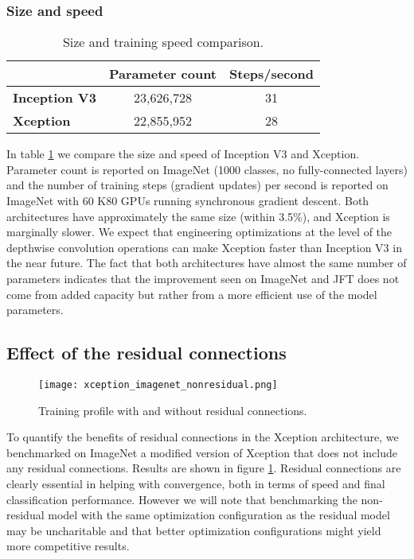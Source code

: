 \documentclass[10pt,twocolumn,letterpaper]{article}
\begin{document}
\subsubsection{Size and speed}

\begin{table}[!ht]
\centering
\caption{Size and training speed comparison.}
\label{sizeandspeed}

  \begin{tabular}{lcc}
  \toprule
               & \textbf{Parameter count} & \textbf{Steps/second} \\ \hline
  \textbf{Inception V3}  &   23,626,728   &     31                 \\ \hline
  \textbf{Xception} &       22,855,952   &     28                   \\ \hline

  \end{tabular}

\end{table}

In table \ref{sizeandspeed} we compare the size and speed of Inception V3 and Xception. Parameter count is reported on ImageNet (1000 classes, no fully-connected layers) and the number of training steps (gradient updates) per second is reported on ImageNet with 60 K80 GPUs running synchronous gradient descent. Both architectures have approximately the same size (within 3.5\%), and Xception is marginally slower. We expect that engineering optimizations at the level of the depthwise convolution operations can make Xception faster than Inception V3 in the near future. The fact that both architectures have almost the same number of parameters indicates that the improvement seen on ImageNet and JFT does not come from added capacity but rather from a more efficient use of the model parameters.


\subsection{Effect of the residual connections}

\begin{figure}[!ht]
  \caption{Training profile with and without residual connections.}
  \label{xception_imagenet_nonresidual}
  \centering
    \texttt{[image: xception\_imagenet\_nonresidual.png]}
\end{figure}

To quantify the benefits of residual connections in the Xception architecture, we benchmarked on ImageNet a modified version of Xception that does not include any residual connections. Results are shown in figure \ref{xception_imagenet_nonresidual}. Residual connections are clearly essential in helping with convergence, both in terms of speed and final classification performance. However we will note that benchmarking the non-residual model with the same optimization configuration as the residual model may be uncharitable and that better optimization configurations might yield more competitive results.
\end{document}
